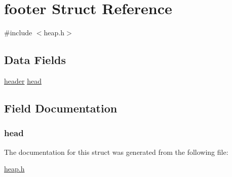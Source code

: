 \hypertarget{structfooter}{}\section{footer Struct Reference}
\label{structfooter}


{\ttfamily \#include $<$heap.\+h$>$}

\subsection*{Data Fields}
\begin{DoxyCompactItemize}
\item 
\hyperlink{structheader}{header} \hyperlink{structfooter_a0e77a30e5469bc62f17579602fc74bc3}{head}
\end{DoxyCompactItemize}


\subsection{Field Documentation}
\hypertarget{structfooter_a0e77a30e5469bc62f17579602fc74bc3}{}
\subsubsection[{head}]{ head}\label{structfooter_a0e77a30e5469bc62f17579602fc74bc3}


The documentation for this struct was generated from the following file\+:\begin{DoxyCompactItemize}
\item 
\hyperlink{heap_8h}{heap.\+h}\end{DoxyCompactItemize}
